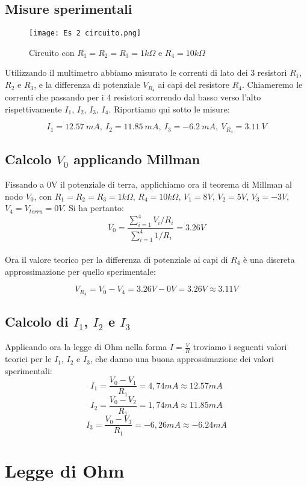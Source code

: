 \documentclass{article}
\begin{document}
		\subsection{Misure sperimentali}			
			\begin{figure}[h]
				\caption{Circuito con $R_1=R_2=R_3=1k\Omega$ e $R_4=10k\Omega$}
				\centering
				\texttt{[image: Es 2 circuito.png]}
			\end{figure}

			Utilizzando il multimetro abbiamo misurato le correnti di lato dei 3 resistori $R_1$, $R_2$ e $R_3$, 
			e la differenza di potenziale $V_{R_4}$ ai capi del resistore $R_4$. Chiameremo le correnti 
			che passando per i 4 resistori scorrendo dal basso verso l'alto rispettivamente $I_1$, $I_2$, $I_3$, $I_4$.
			Riportiamo qui sotto le misure:

			\[
				I_1= 12.57 \ mA,\
				I_2= 11.85 \ mA, \
				I_3= -6.2 \ mA, \
				V_{R_4}=3.11 \ V
			\]	

			
		\subsection{Calcolo $V_0$ applicando Millman}
			Fissando a 0V il potenziale di terra, applichiamo ora il teorema di Millman al nodo $V_0$, con $R_1=R_2=R_3=1k\Omega$,
			$R_4=10k\Omega$, $V_1=8V$, $V_2=5V$, $V_3=-3V$, $V_4=V_{terra}=0V$. Si ha pertanto:
			\\	
			\[
				V_0 = \frac{\sum_{i=1}^{4} V_i/R_i}{\sum_{i=1}^{4} 1/R_i} = 3.26V
			\]
			\\
			Ora il valore teorico per la differenza di potenziale ai capi di $R_4$ è una discreta approssimazione per quello sperimentale:

			\[
				V_{R_4} = V_0 - V_4 = 3.26V - 0V = 3.26V \approx 3.11V
			\]
		
		\subsection{Calcolo di $I_1$, $I_2$ e $I_3$}
			Applicando ora la legge di Ohm nella forma $I=\frac{V}{R}$ troviamo i seguenti valori teorici per le $I_1$, $I_2$ e $I_3$, che danno una 
			buona approssimazione dei valori sperimentali:
			\[
				I_1=\frac{V_0 - V_1}{R_1}=4,74mA \approx 12.57mA
			\]
			\[
				I_2=\frac{V_0 - V_2}{R_1}=1,74mA \approx 11.85mA
			\]
			\[
				I_3=\frac{V_0 - V_3}{R_1}=-6,26mA \approx -6.24mA
			\]


	
	
	\section{Legge di Ohm} \label{sec:Ohm}
\end{document}
